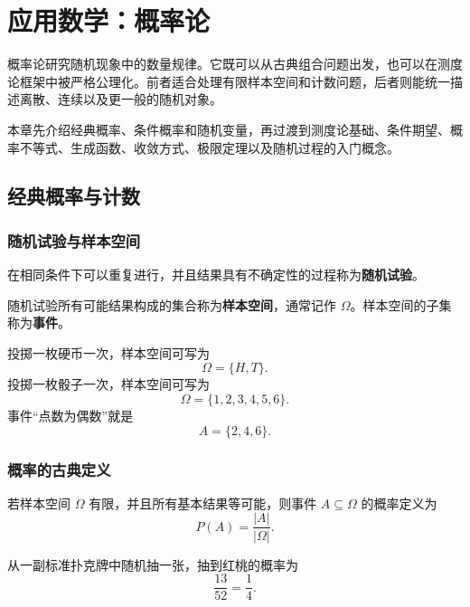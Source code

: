 \chapter{应用数学：概率论}

概率论研究随机现象中的数量规律。它既可以从古典组合问题出发，也可以在测度论框架中被严格公理化。前者适合处理有限样本空间和计数问题，后者则能统一描述离散、连续以及更一般的随机对象。

本章先介绍经典概率、条件概率和随机变量，再过渡到测度论基础、条件期望、概率不等式、生成函数、收敛方式、极限定理以及随机过程的入门概念。

\section{经典概率与计数}

\subsection{随机试验与样本空间}

\begin{definition}[随机试验]
在相同条件下可以重复进行，并且结果具有不确定性的过程称为\textbf{随机试验}。
\end{definition}

\begin{definition}[样本空间与事件]
随机试验所有可能结果构成的集合称为\textbf{样本空间}，通常记作 $\Omega$。样本空间的子集称为\textbf{事件}。
\end{definition}

\begin{example}
投掷一枚硬币一次，样本空间可写为
\[
    \Omega=\{H,T\}.
\]
投掷一枚骰子一次，样本空间可写为
\[
    \Omega=\{1,2,3,4,5,6\}.
\]
事件“点数为偶数”就是
\[
    A=\{2,4,6\}.
\]
\end{example}

\subsection{概率的古典定义}

\begin{definition}[古典概率]
若样本空间 $\Omega$ 有限，并且所有基本结果等可能，则事件 $A\subseteq\Omega$ 的概率定义为
\[
    P(A)=\frac{|A|}{|\Omega|}.
\]
\end{definition}

\begin{example}
从一副标准扑克牌中随机抽一张，抽到红桃的概率为
\[
    \frac{13}{52}=\frac14.
\]
\end{example}

